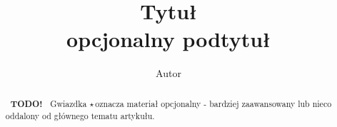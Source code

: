 \documentclass[12pt, notitlepage]{article}
\title{Tytuł\todo\\
\large opcjonalny podtytuł\todo}
\author{Autor\todo}
\theoremstyle{plain}
\theoremstyle{definition}
\theoremstyle{remark}
\newcommand{\todo}{\textbf{~TODO!~}}
\newcommand{\starred}{$\star$\,}
\begin{document}
  \maketitle
  \begin{abstract}
   \todo
    Gwiazdka \starred oznacza materiał opcjonalny - bardziej zaawansowany lub nieco oddalony od głównego tematu artykułu.
  \end{abstract}

\end{document}
